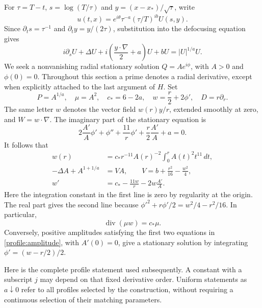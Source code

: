 For $\tau=T-t$, $s=\log(T/\tau)$ and
$y=(x-x_*)/\sqrt\tau$, write
\[
 u(t,x)=e^{i\theta}\tau^{-a}(\tau/T)^{ib}U(s,y).
\]
Since $\partial_t s=\tau^{-1}$ and
$\partial_t y=y/(2\tau)$, substitution into the defocusing equation gives
\begin{equation}\label{profile:similarity}
 i\partial_sU+\Delta U+i\left(\frac{y\cdot\nabla}{2}+a\right)U+bU
       =|U|^{1/a}U.
\end{equation}
We seek a nonvanishing radial stationary solution $Q=Ae^{i\phi}$, with
$A>0$ and $\phi(0)=0$.  Throughout this section a prime denotes a radial
derivative, except when explicitly attached to the last argument of $H$.
Set
\begin{equation}\label{profile:notation}
 P=A^{1/a},\quad \mu=A^2,\quad c_*=6-2a,\quad
 w=\frac r2+2\phi',\quad D=r\partial_r.
\end{equation}
The same letter $w$ denotes the vector field $w(r)y/r$, extended smoothly
at zero, and $W=w\cdot\nabla$.  The imaginary part of the stationary
equation is
\[
 2\frac{A'}A\phi'+\phi''+\frac{11}{r}\phi'
       +\frac r2\frac{A'}A+a=0.
\]
It follows that
\begin{equation}\label{profile:amplitude}
 \begin{split}
 w(r)&=c_*r^{-11}A(r)^{-2}\int_0^r A(t)^2t^{11}\,dt,\\
 -\Delta A+A^{1+1/a}&=VA,\qquad
 V=b+\frac{r^2}{16}-\frac{w^2}{4},\\
 w'&=c_*-\frac{11w}{r}-2w\frac{A'}A.
 \end{split}
\end{equation}
Here the integration constant in the first line is zero by regularity at
the origin.  The real part gives the second line because
$\phi'^2+r\phi'/2=w^2/4-r^2/16$.  In particular,
\begin{equation}\label{profile:divergence}
 \operatorname{div}(\mu w)=c_*\mu.
\end{equation}
Conversely, positive amplitudes satisfying the first two equations in
\eqref{profile:amplitude}, with $A'(0)=0$, give a stationary solution by
integrating $\phi'=(w-r/2)/2$.

Here is the complete profile statement used subsequently.  A constant
with a subscript $j$ may depend on that fixed derivative order.  Uniform
statements as $a\downarrow0$ refer to all profiles selected by the
construction, without requiring a continuous selection of their matching
parameters.


